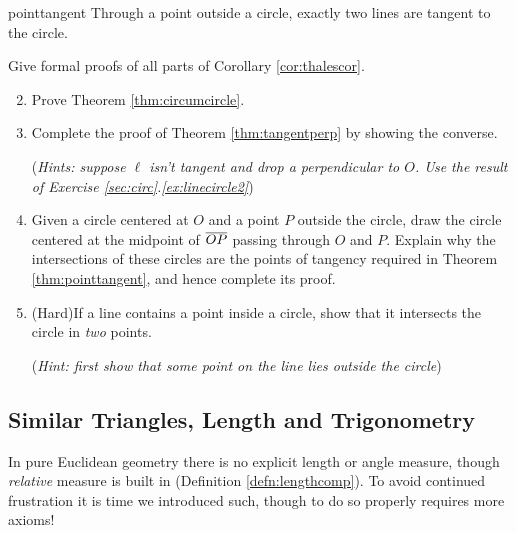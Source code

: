 \begin{thm}{}{pointtangent}
Through a point outside a circle, exactly two lines are tangent to the circle.
\end{thm}

\begin{exercises}
\exstart Give formal proofs of all parts of Corollary \ref{cor:thalescor}.
\begin{enumerate}\setcounter{enumi}{1} 
  \item Prove Theorem \ref{thm:circumcircle}.
  
  \item Complete the proof of Theorem \ref{thm:tangentperp} by showing the converse.\par
  (\emph{Hints: suppose $\ell$ isn't tangent and drop a perpendicular to $O$. Use the result of Exercise \ref*{sec:circ}.\ref{ex:linecircle2}})
  
  \item\label{ex:pointtangent} Given a circle centered at $O$ and a point $P$ outside the circle, draw the circle centered at the midpoint of $\overline{OP}$ passing through $O$ and $P$. Explain why the intersections of these circles are the points of tangency required in Theorem \ref{thm:pointtangent}, and hence complete its proof.
  
  \item\label{ex:linecircle2} (Hard)\lstsp If a line contains a point inside a circle, show that it intersects the circle in \emph{two} points.\par
  (\emph{Hint: first show that some point on the line lies outside the circle})
\end{enumerate}
\end{exercises}

\clearpage

\subsection{Similar Triangles, Length and Trigonometry}\label{sec:similar}

In pure Euclidean geometry there is no explicit length or angle measure, though \emph{relative} measure is built in (Definition \ref{defn:lengthcomp}). To avoid continued frustration it is time we introduced such, though to do so properly requires more axioms!


